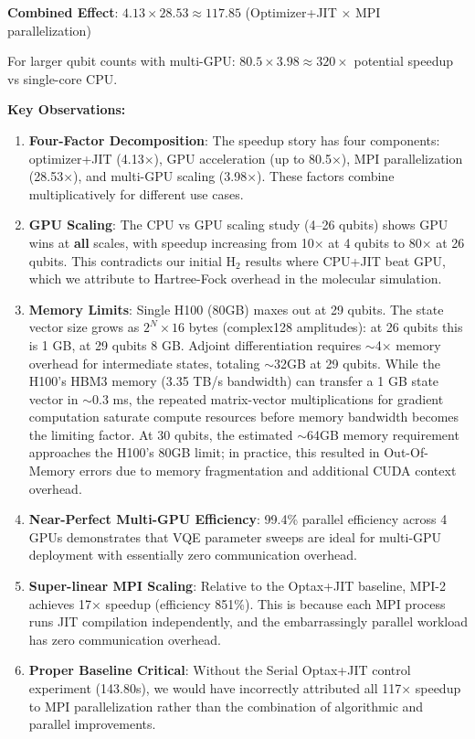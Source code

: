 \documentclass[11pt]{article}
\begin{document}
\textbf{Combined Effect}: $4.13 \times 28.53 \approx 117.85$ (Optimizer+JIT × MPI parallelization)

For larger qubit counts with multi-GPU: $80.5 \times 3.98 \approx 320\times$ potential speedup vs single-core CPU.

\textbf{Key Observations:}

\begin{enumerate}
    \item \textbf{Four-Factor Decomposition}: The speedup story has four components: optimizer+JIT (4.13×), GPU acceleration (up to 80.5×), MPI parallelization (28.53×), and multi-GPU scaling (3.98×). These factors combine multiplicatively for different use cases.

    \item \textbf{GPU Scaling}: The CPU vs GPU scaling study (4--26 qubits) shows GPU wins at \textbf{all} scales, with speedup increasing from 10× at 4 qubits to 80× at 26 qubits. This contradicts our initial H$_2$ results where CPU+JIT beat GPU, which we attribute to Hartree-Fock overhead in the molecular simulation.

    \item \textbf{Memory Limits}: Single H100 (80GB) maxes out at 29 qubits. The state vector size grows as $2^N \times 16$ bytes (complex128 amplitudes): at 26 qubits this is 1 GB, at 29 qubits 8 GB. Adjoint differentiation requires $\sim$4$\times$ memory overhead for intermediate states, totaling $\sim$32GB at 29 qubits. While the H100's HBM3 memory (3.35 TB/s bandwidth) can transfer a 1 GB state vector in $\sim$0.3 ms, the repeated matrix-vector multiplications for gradient computation saturate compute resources before memory bandwidth becomes the limiting factor. At 30 qubits, the estimated $\sim$64GB memory requirement approaches the H100's 80GB limit; in practice, this resulted in Out-Of-Memory errors due to memory fragmentation and additional CUDA context overhead.

    \item \textbf{Near-Perfect Multi-GPU Efficiency}: 99.4\% parallel efficiency across 4 GPUs demonstrates that VQE parameter sweeps are ideal for multi-GPU deployment with essentially zero communication overhead.

    \item \textbf{Super-linear MPI Scaling}: Relative to the Optax+JIT baseline, MPI-2 achieves 17× speedup (efficiency 851\%). This is because each MPI process runs JIT compilation independently, and the embarrassingly parallel workload has zero communication overhead.

    \item \textbf{Proper Baseline Critical}: Without the Serial Optax+JIT control experiment (143.80s), we would have incorrectly attributed all 117× speedup to MPI parallelization rather than the combination of algorithmic and parallel improvements.
\end{enumerate}
\end{document}
